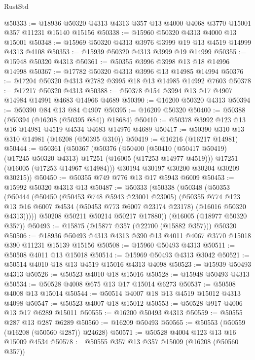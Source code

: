 \begin{lexlean}{RustStd}
\begin{coremodule}
@50333 := @18936 @50320 @4313 @4313 @357 @13 @4000 @4068 @3770 @15001 @357 @11231 @15140 @15156
@50338 := @15960 @50320 @4313 @4000 @13 @15001
@50348 := @15969 @50320 @4313 @3976 @3999 @19 @13 @4519 @14999 @4313 @4108
@50353 := @15939 @50320 @4313 @3999 @19 @14999
@50355 := @15948 @50320 @4313
@50361 := @50355 @3996 @3998 @13 @18 @14996 @14998
@50367 := @17782 @50320 @4313 @3996 @13 @14985 @14994
@50376 := @17204 @50320 @4313 @2782 @3995 @18 @13 @14985 @14992 @7603
@50378 := @17217 @50320 @4313
@50388 := @50378 @154 @3994 @13 @17 @4907 @14984 @14991 @4683 @14966 @4689
@50390 := @16200 @50320 @4313
@50394 := @50390 @84 @13 @84 @4907
@50395 := @16209 @50320
@50400 := @50388 (@50394 (@16208 (@50395 @84)) @18684)
@50410 := @50378 @3992 @123 @13 @16 @14981 @4519 @4534 @4683 @14976 @4689
@50417 := @50390 @310 @13 @310 @14981 (@16208 (@50395 @310))
@50419 := @16216 (@16217 @14981)
@50444 := @50361
    (@50367
      (@50376
        (@50400
          (@50410 (@50417 @50419) (@17245 @50320 @4313) @17251 (@16005 (@17253 @14977 @4519)))
          @17251
          (@16005 (@17253 @14967 @14984)))
        @30194
        @30197
        @30200
        @30204
        @30209
        @30215))
@50450 := @50355 @749 @776 @13 @17 @5943 @6009
@50453 := @15992 @50320 @4313 @13
@50487 := @50333
    (@50338
      (@50348
        (@50353
          (@50444
            (@50450
              (@50453 @748 @5943 @23001 @23005)
              (@50355
                @774
                @123
                @13
                @16
                @6007
                @4534
                (@50453 @773 @6007 @23174 @23178)
                (@16016 @50320 @4313)))))
        @50208
        @50211
        @50214
        @50217
        @17880))
    (@16005 (@18977 @50320 @357))
@50493 := @15875 (@15877 @357 (@22700 (@15882 @357))) @50320
@50506 := @18936 @50493 @4313 @4313 @390 @13 @4011 @4067 @3770 @15018 @390 @11231 @15139 @15156
@50508 := @15960 @50493 @4313
@50511 := @50508 @4011 @13 @15018
@50514 := @15969 @50493 @4313 @3042
@50521 := @50514 @4010 @18 @13 @4519 @15016 @4313 @4098
@50523 := @15939 @50493 @4313
@50526 := @50523 @4010 @18 @15016
@50528 := @15948 @50493 @4313
@50534 := @50528 @4008 @675 @13 @17 @15014 @6273
@50537 := @50508 @4008 @13 @15014
@50544 := @50514 @4007 @18 @13 @4519 @15012 @4313 @4098
@50547 := @50523 @4007 @18 @15012
@50553 := @50528 @917 @4006 @13 @17 @6289 @15011
@50555 := @16200 @50493 @4313
@50559 := @50555 @287 @13 @287 @6289
@50560 := @16209 @50493
@50565 := @50553 (@50559 (@16208 (@50560 @287)) @24628)
@50571 := @50528 @4004 @123 @13 @16 @15009 @4534
@50578 := @50555 @357 @13 @357 @15009 (@16208 (@50560 @357))

\end{coremodule}
\end{lexlean}
